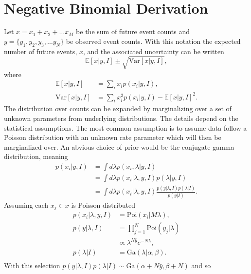 \section{Negative Binomial Derivation}
Let $x=x_1+x_2+\dots x_M$ be the sum of future event counts and $y=\{y_1,y_2,y_3,\dots y_N\}$ be observed event counts. With this notation the expected number of future events, $x$, and the associated uncertainty can be written
\begin{equation}
	\mathbb{E}[x|y,I]\pm \sqrt{\text{Var}[x|y,I]},
\end{equation}
where
\begin{equation}
	\begin{split}
		\mathbb{E}[x|y,I] &= \sum_i x_ip(x_i|y,I),\\
		\text{Var}[x|y,I] &=  \sum_i x_i^2p(x_i|y,I)-\mathbb{E}[x|y,I]^2.
	\end{split}
	\label{h1}
\end{equation}
The distribution over counts can be expanded by marginalizing over a set of unknown parameters from underlying distributions. The details depend on the statistical assumptions. The most common assumption is to assume data follow a Poisson distribution with an unknown rate parameter which will then be marginalized over. An abvious choice of prior would be the conjugate gamma distribution, meaning
\begin{equation}
	\begin{split}
		p(x_i|y,I) &= \int d\lambda p(x_i,\lambda|y,I)\\
		&=\int d\lambda p(x_i|\lambda,y,I)p(\lambda|y,I)\\
		&= \int d\lambda p(x_i|\lambda,y,I)\frac{p(y|\lambda,I)p(\lambda|I)}{p(y|I)}.
	\end{split}
	\label{h4}
\end{equation}
Assuming each $x_j\in x$ is Poisson distributed
\begin{equation}
	\begin{split}
		p(x_i|\lambda,y,I) &= \text{Poi}(x_i|M\lambda),\\
		p(y|\lambda,I) &= \prod_{j=1}^N\text{Poi}(y_j|\lambda)\\
		&\propto \lambda^{N\bar{y}}e^{-N\lambda},\\
		p(\lambda|I) &= \text{Ga}(\lambda|\alpha,\beta).\\
	\end{split}
\end{equation}
With this selection $p(y|\lambda,I)p(\lambda|I)\sim \text{Ga}(\alpha+N\bar{y},\beta +N)$ and so
